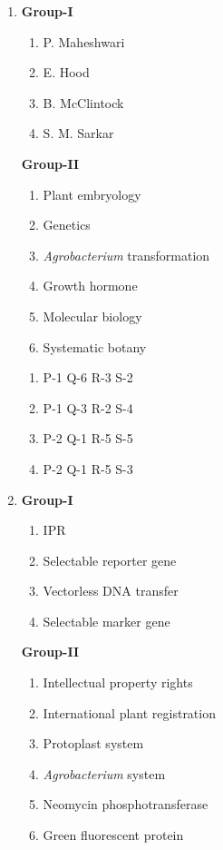 \documentclass[journal,12pt,onecolumn]{IEEEtran}
\begin{document}
\begin{enumerate}
\item
\begin{multicols}{2}
\textbf{Group-I}
\begin{enumerate}[label=(\Alph*) ,start=16]
    \item P. Maheshwari
    \item E. Hood
    \item B. McClintock
    \item S. M. Sarkar
\end{enumerate}

\columnbreak

\textbf{Group-II}
\begin{enumerate}[label=\arabic*.]
    \item Plant embryology
    \item Genetics
    \item \textit{Agrobacterium} transformation
    \item Growth hormone
    \item Molecular biology
    \item Systematic botany
\end{enumerate}
\end{multicols}

\begin{multicols}{2}
\begin{enumerate}[label=(\Alph*)]
    \item P-1 Q-6 R-3 S-2
    \item P-1 Q-3 R-2 S-4
    \item P-2 Q-1 R-5 S-5
    \item P-2 Q-1 R-5 S-3
\end{enumerate}
\end{multicols}

\item
\begin{multicols}{2}
\textbf{Group-I}
\begin{enumerate}[label=(\Alph*) ,start=16]
    \item IPR
    \item Selectable reporter gene
    \item Vectorless DNA transfer
    \item Selectable marker gene
\end{enumerate}

\columnbreak

\textbf{Group-II}
\begin{enumerate}[label=\arabic*.]
    \item Intellectual property rights
    \item International plant registration
    \item Protoplast system
    \item \textit{Agrobacterium} system
    \item Neomycin phosphotransferase
    \item Green fluorescent protein
\end{enumerate}
\end{multicols}


\end{enumerate}
\end{document}

